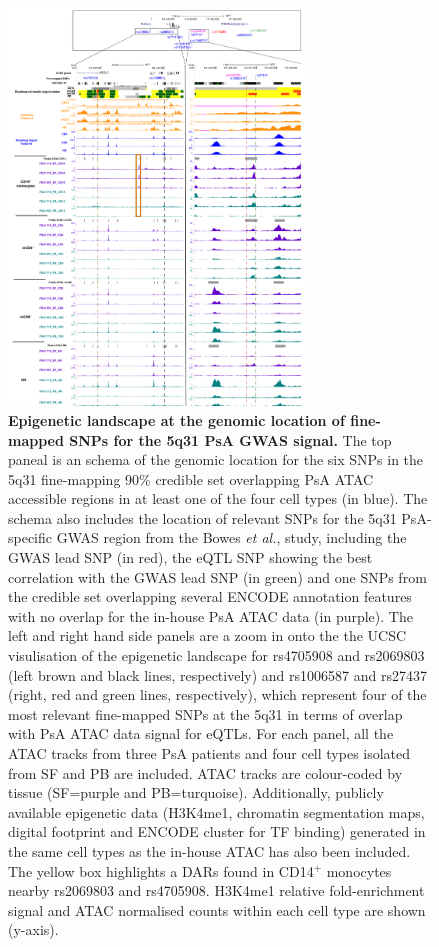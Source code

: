 \begin{figure}[htbp]
\centering
\includegraphics[width=0.7\textwidth]{./Results3/pdfs/UCSC_chr5q31_credible_set_all_cell_types_multipanel_final}
\caption[Epigenetic landscape at the genomic location of fine-mapped SNPs for the 5q31 PsA GWAS signal.]{\textbf{Epigenetic landscape at the genomic location of fine-mapped SNPs for the 5q31 PsA GWAS signal.} The top paneal is an schema of the genomic location for the six SNPs in the 5q31 fine-mapping 90\% credible set overlapping PsA ATAC accessible regions in at least one of the four cell types (in blue). The schema also includes the location of relevant SNPs for the 5q31 PsA-specific GWAS region from the Bowes \textit{et al.}, study, including the GWAS lead SNP (in red), the eQTL SNP showing the best correlation with the GWAS lead SNP (in green) and one SNPs from the credible set overlapping several ENCODE annotation features with no overlap for the in-house PsA ATAC data (in purple). The left and right hand side panels are a zoom in onto the the UCSC visulisation of the epigenetic landscape for rs4705908 and rs2069803 (left brown and black lines, respectively) and rs1006587 and rs27437 (right, red and green lines, respectively), which represent four of the most relevant fine-mapped SNPs at the 5q31 in terms of overlap with PsA ATAC data signal for eQTLs. For each panel, all the ATAC tracks from three PsA patients and four cell types isolated from SF and PB are included. ATAC tracks are colour-coded by tissue (SF=purple and PB=turquoise). Additionally, publicly available epigenetic data (H3K4me1, chromatin segmentation maps, digital footprint and ENCODE cluster for TF binding) generated in the same cell types as the in-house ATAC has also been included. The yellow box highlights a DARs found in CD14$^+$ monocytes nearby rs2069803 and rs4705908. H3K4me1 relative fold-enrichment signal and ATAC normalised counts within each cell type are shown (y-axis).}
\label{figure:STAT2_fine_mapping_SNPs_epigenetic_track}
\end{figure}


